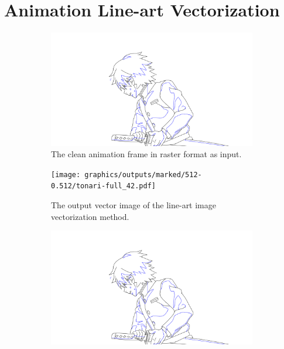 \chapter{Animation Line-art Vectorization}
\label{ch:alg}

\begin{figure}
    \centering
    \begin{subfigure}{.45\textwidth}
        \includegraphics[width=\textwidth]{graphics/outputs/tonari-full_42.png}
        \caption{The clean animation frame in raster format as input.}
        \label{fig:tonari-42.input}
    \end{subfigure}
    \begin{subfigure}{.45\textwidth}
        \texttt{[image: graphics/outputs/marked/512-0.512/tonari-full\_42.pdf]}
        \caption{The output vector image of the line-art image vectorization method.}
        \label{fig:tonari-42-output}
    \end{subfigure}
    \begin{subfigure}{.45\textwidth}
        \includegraphics[width=\textwidth,trim={200px 57px 140px 175px},clip]{graphics/outputs/tonari-full_42.png}

\end{subfigure}
\end{figure}
